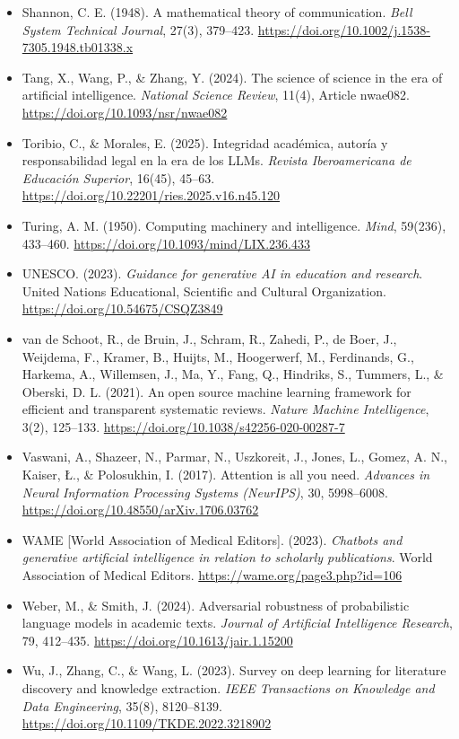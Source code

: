 \begin{itemize}[leftmargin=1.5em, label={}, itemsep=0.22ex, parsep=0pt]
    \item Shannon, C. E. (1948). A mathematical theory of communication. \textit{Bell System Technical Journal}, 27(3), 379--423. \url{https://doi.org/10.1002/j.1538-7305.1948.tb01338.x}
    \item Tang, X., Wang, P., \& Zhang, Y. (2024). The science of science in the era of artificial intelligence. \textit{National Science Review}, 11(4), Article nwae082. \url{https://doi.org/10.1093/nsr/nwae082}
    \item Toribio, C., \& Morales, E. (2025). Integridad académica, autoría y responsabilidad legal en la era de los LLMs. \textit{Revista Iberoamericana de Educación Superior}, 16(45), 45--63. \url{https://doi.org/10.22201/ries.2025.v16.n45.120}
    \item Turing, A. M. (1950). Computing machinery and intelligence. \textit{Mind}, 59(236), 433--460. \url{https://doi.org/10.1093/mind/LIX.236.433}
    \item UNESCO. (2023). \textit{Guidance for generative AI in education and research}. United Nations Educational, Scientific and Cultural Organization. \url{https://doi.org/10.54675/CSQZ3849}
    \item van de Schoot, R., de Bruin, J., Schram, R., Zahedi, P., de Boer, J., Weijdema, F., Kramer, B., Huijts, M., Hoogerwerf, M., Ferdinands, G., Harkema, A., Willemsen, J., Ma, Y., Fang, Q., Hindriks, S., Tummers, L., \& Oberski, D. L. (2021). An open source machine learning framework for efficient and transparent systematic reviews. \textit{Nature Machine Intelligence}, 3(2), 125--133. \url{https://doi.org/10.1038/s42256-020-00287-7}
    \item Vaswani, A., Shazeer, N., Parmar, N., Uszkoreit, J., Jones, L., Gomez, A. N., Kaiser, \L{}., \& Polosukhin, I. (2017). Attention is all you need. \textit{Advances in Neural Information Processing Systems (NeurIPS)}, 30, 5998--6008. \url{https://doi.org/10.48550/arXiv.1706.03762}
    \item WAME [World Association of Medical Editors]. (2023). \textit{Chatbots and generative artificial intelligence in relation to scholarly publications}. World Association of Medical Editors. \url{https://wame.org/page3.php?id=106}
    \item Weber, M., \& Smith, J. (2024). Adversarial robustness of probabilistic language models in academic texts. \textit{Journal of Artificial Intelligence Research}, 79, 412--435. \url{https://doi.org/10.1613/jair.1.15200}
    \item Wu, J., Zhang, C., \& Wang, L. (2023). Survey on deep learning for literature discovery and knowledge extraction. \textit{IEEE Transactions on Knowledge and Data Engineering}, 35(8), 8120--8139. \url{https://doi.org/10.1109/TKDE.2022.3218902}

\end{itemize}
